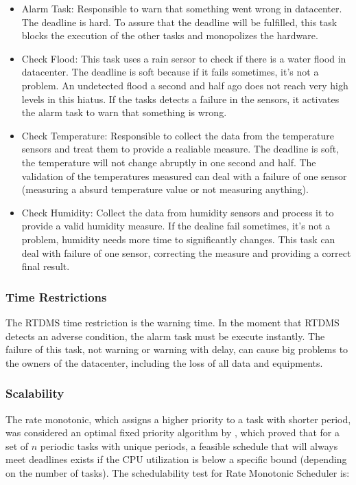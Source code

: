 \documentclass[12pt]{article}
\begin{document}
\begin{itemize}
 \item Alarm Task: Responsible to warn that something went wrong in datacenter. The deadline is hard. To assure
 that the deadline will be fulfilled, this task blocks the execution of the other tasks and monopolizes the hardware.
 \item Check Flood: This task uses a rain sersor to check if there is a water flood in datacenter. The deadline is
 soft because if it fails sometimes, it's not a problem. An undetected flood a second and half ago does not reach
 very high levels in this hiatus. If the tasks detects a failure in the sensors, it activates the alarm task to warn
 that something is wrong.
 \item Check Temperature: Responsible to collect the data from the temperature sensors and treat them to provide
 a realiable measure. The deadline is soft, the temperature will not change abruptly in one second and half. The
 validation of the temperatures measured can deal with a failure of one sensor (measuring a absurd temperature value
 or not measuring anything).
 \item Check Humidity: Collect the data from humidity sensors and process it to provide a valid humidity measure. If the
 dealine fail sometimes, it's not a problem, humidity needs more time to significantly changes. This task can deal with 
 failure of one sensor, correcting the measure and providing a correct final result.
\end{itemize}

\subsubsection{Time Restrictions}

The RTDMS time restriction is the warning time. In the moment that RTDMS detects an adverse condition,
the alarm task must be execute instantly. The failure of this task, not warning or warning with delay,
can cause big problems to the owners of the datacenter, including the loss of all data and equipments.

\subsubsection{Scalability}

The rate monotonic, which assigns a higher priority to a task with shorter period, was considered an
optimal fixed priority algorithm by \cite{liu1973scheduling}, which proved that for a set of \(n\) periodic 
tasks with unique periods, a feasible schedule that will always meet deadlines exists if the CPU 
utilization is below a specific bound (depending on the number of tasks). The schedulability test 
for Rate Monotonic Scheduler is:
\end{document}
